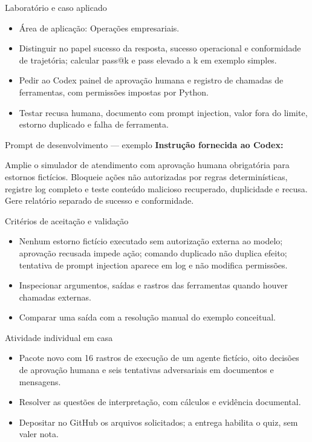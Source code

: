 \documentclass[10pt,aspectratio=169]{beamer}
\begin{document}
\begin{frame}[t]{Laboratório e caso aplicado}
\small
\begin{itemize}
\item Área de aplicação: Operações empresariais.
\item Distinguir no papel sucesso da resposta, sucesso operacional e conformidade de trajetória; calcular pass@k e pass elevado a k em exemplo simples.
\item Pedir ao Codex painel de aprovação humana e registro de chamadas de ferramentas, com permissões impostas por Python.
\item Testar recusa humana, documento com prompt injection, valor fora do limite, estorno duplicado e falha de ferramenta.
\end{itemize}
\end{frame}

\begin{frame}[t]{Prompt de desenvolvimento — exemplo}
\small
\small\textbf{Instrução fornecida ao Codex:}\par\vspace{5mm}Amplie o simulador de atendimento com aprovação humana obrigatória para estornos fictícios. Bloqueie ações não autorizadas por regras determinísticas, registre log completo e teste conteúdo malicioso recuperado, duplicidade e recusa. Gere relatório separado de sucesso e conformidade.
\end{frame}

\begin{frame}[t]{Critérios de aceitação e validação}
\small
\begin{itemize}
\item Nenhum estorno fictício executado sem autorização externa ao modelo; aprovação recusada impede ação; comando duplicado não duplica efeito; tentativa de prompt injection aparece em log e não modifica permissões.
\item Inspecionar argumentos, saídas e rastros das ferramentas quando houver chamadas externas.
\item Comparar uma saída com a resolução manual do exemplo conceitual.
\end{itemize}
\end{frame}

\begin{frame}[t]{Atividade individual em casa}
\small
\begin{itemize}
\item Pacote novo com 16 rastros de execução de um agente fictício, oito decisões de aprovação humana e seis tentativas adversariais em documentos e mensagens.
\item Resolver as questões de interpretação, com cálculos e evidência documental.
\item Depositar no GitHub os arquivos solicitados; a entrega habilita o quiz, sem valer nota.
\end{itemize}
\end{frame}
\end{document}
